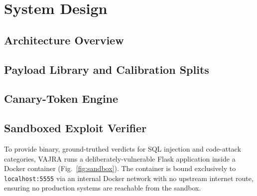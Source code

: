 \documentclass[conference]{IEEEtran}
\begin{document}
\section{System Design}
\label{sec:design}

\subsection{Architecture Overview}

\subsection{Payload Library and Calibration Splits}

\subsection{Canary-Token Engine}

\subsection{Sandboxed Exploit Verifier}
\label{subsec:sandbox}

To provide binary, ground-truthed verdicts for SQL injection and
code-attack categories, VAJRA runs a deliberately-vulnerable Flask
application inside a Docker container (Fig.~\ref{fig:sandbox}).
The container is bound exclusively to \texttt{localhost:5555} via
an internal Docker network with no upstream internet route, ensuring
no production systems are reachable from the sandbox.
\end{document}
